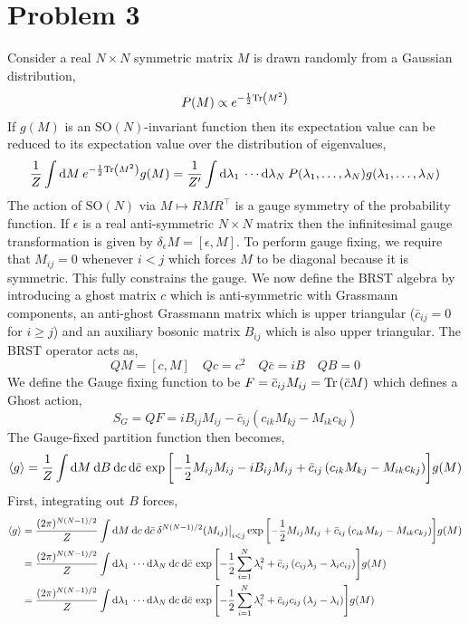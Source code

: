 \documentclass[12pt]{article}
\begin{document}
\section*{Problem 3}

Consider a real $N \times N$ symmetric matrix $M$ is drawn randomly from a Gaussian distribution,
\[ P(M) \propto e^{-\frac{1}{2} \mathrm{Tr}\left( M^2 \right)} \]
If $g(M)$ is an $\mathrm{SO}(N)$-invariant function then its expectation value can be reduced to its expectation value over the distribution of eigenvalues,
\[ \frac{1}{Z} \int \mathrm{d}M \: e^{-\frac{1}{2} \mathrm{Tr}\left( M^2 \right)} g(M) = \frac{1}{Z'} \int \mathrm{d}\lambda_1 \: \cdots \mathrm{d}\lambda_N \: P(\lambda_1, \dots, \lambda_N) g(\lambda_1, \dots, \lambda_N) \]
The action of $\mathrm{SO}(N)$ via $M \mapsto R M R^{\top}$ is a gauge symmetry of the probability function. If $\epsilon$ is a real anti-symmetric $N \times N$ matrix then the infinitesimal gauge transformation is given by $\delta_{\epsilon} M = [\epsilon, M]$. To perform gauge fixing, we require that $M_{ij} = 0$ whenever $i < j$ which forces $M$ to be diagonal because it is symmetric. This fully constrains the gauge. We now define the BRST algebra by introducing a ghost matrix $c$ which is anti-symmetric with Grassmann components, an anti-ghost Grassmann matrix which is upper triangular ($\bar{c}_{ij} = 0$ for $i \ge j$) and an auxiliary bosonic matrix $B_{ij}$ which is also upper triangular. The BRST operator acts as,
\[ QM = [c, M] \quad Qc = c^2 \quad Q \bar{c} = i B \quad QB = 0 \]
We define the Gauge fixing function to be $F = \bar{c}_{ij} M_{ij} = \mathrm{Tr}\left( \bar{c} M \right)$ which defines a Ghost action,
\[ S_G = Q F = i B_{ij} M_{ij} - \bar{c}_{ij} \left( c_{ik} M_{kj} - M_{ik} c_{kj} \right)   \]
The Gauge-fixed partition function then becomes,
\[ \left< g \right> = \frac{1}{Z} \int \mathrm{d}M \: \mathrm{d}B \: \mathrm{d}c \: \mathrm{d}\bar{c} \: \exp{\left[ -\frac{1}{2} M_{ij} M_{ij} - i B_{ij} M_{ij} + \bar{c}_{ij} \left( c_{ik} M_{kj} - M_{ik} c_{kj} \right) \right] } g(M) \]
First, integrating out $B$ forces,
\begin{align*} 
\left< g \right> & = \frac{(2 \pi)^{N(N-1)/2}}{Z} \int \mathrm{d}M \: \mathrm{d}c \: \mathrm{d}\bar{c} \: \delta^{N(N-1)/2}(M_{ij}) \big|_{i < j} \exp{\left[ -\frac{1}{2} M_{ij} M_{ij} + \bar{c}_{ij} \left( c_{ik} M_{kj} - M_{ik} c_{kj} \right) \right] } g(M)
\\
& = \frac{(2 \pi)^{N(N-1)/2}}{Z} \int \mathrm{d}\lambda_1 \: \cdots \mathrm{d}\lambda_N \: \mathrm{d}c \: \mathrm{d}\bar{c} \: \exp{\left[ -\frac{1}{2} \sum_{i = 1}^N \lambda_i^2 + \bar{c}_{ij} \left( c_{ij} \lambda_{j} - \lambda_{i} c_{ij} \right) \right] } g(M)
\\
& = \frac{(2 \pi)^{N(N-1)/2}}{Z} \int \mathrm{d}\lambda_1 \: \cdots \mathrm{d}\lambda_N \: \mathrm{d}c \: \mathrm{d}\bar{c} \: \exp{\left[ -\frac{1}{2} \sum_{i = 1}^N \lambda_i^2 + \bar{c}_{ij} c_{ij} \left( \lambda_{j} - \lambda_{i} \right) \right] } g(M)
\end{align*}
\end{document}
